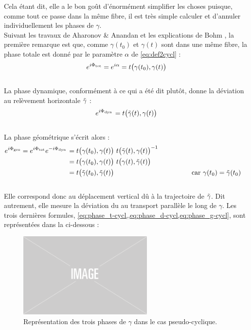 Cela étant dit, elle a le bon goût d'énormément simplifier les choses puisque, comme tout ce passe dans la même fibre, il est très simple calculer et d'annuler individuellement les phases de $\gamma$. 
\\
Suivant les travaux de Aharonov \& Anandan \cite{aharonov_phase_1987} et les explications de Bohm \cite{bohm_geometric_2003}, la première remarque est que, comme $\gamma(t_0)$ et $\gamma(t)$ sont dans une même fibre, la phase totale est donné par le paramètre $\alpha$ de \eqref{eq:def2cycl} :
\begin{equation}\label{eq:phase_t-cycl}
	e^{i\Phi_{\text{\normalfont tot}}} = e^{i\alpha} = t\big( \gamma(t_0), \gamma(t) \big)
\end{equation}
\\
La phase dynamique, conformément à ce qui a été dit plutôt, donne la déviation au relèvement horizontale $\Tilde{\gamma}$ :
\begin{equation}\label{eq:phase_d-cycl}
	e^{i\Phi_{\text{\normalfont dyn}\, }}= t\big( \Tilde{\gamma}(t), \gamma(t) \big)
\end{equation}
\\
La phase géométrique s'écrit alors :
\begin{equation}\label{eq:phase_g-cycl}
	\begin{aligned}
		e^{i\Phi_{\text{\normalfont geo}}}= e^{i\Phi_{\text{\normalfont tot}}} e^{-i\Phi_{\text{\normalfont dyn}\, }} &= t\big( \gamma(t_0), \gamma(t) \big)\ t\big( \Tilde{\gamma}(t), \gamma(t) \big)^{-1} \\
		&= t\big( \gamma(t_0), \gamma(t) \big)\ t\big( \gamma(t), \Tilde{\gamma}(t) \big) \\
		&= t\big( \Tilde{\gamma}(t_0), \Tilde{\gamma}(t) \big)  &  
		&&  &&  &&  && \text{car }\gamma(t_0) &= \Tilde{\gamma}(t_0)
	\end{aligned}
\end{equation}
\\
Elle correspond donc au déplacement vertical dû à la trajectoire de $\Tilde{\gamma}$. Dit autrement, elle mesure la déviation du au transport parallèle le long de $\gamma$. Les trois dernières formules, \cref{eq:phase_t-cycl,,eq:phase_d-cycl,eq:phase_g-cycl}, sont représentées dans la  ci-dessous : 

\begin{figure}[h]
	\includegraphics[width=0.6\textwidth]{fig/placeholder}
	\caption[Représentation des trois phases de $\gamma$ dans le cas pseudo-cyclique]{Représentation des trois phases de $\gamma$ dans le cas pseudo-cyclique.}
	\label{fig:phases-cycl}
\end{figure}

